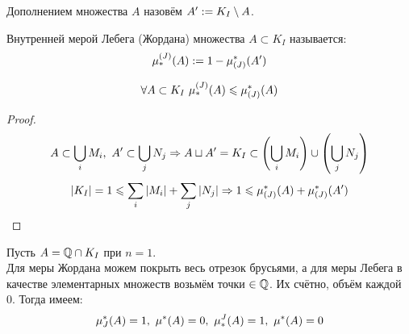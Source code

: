 \begin{definition}
	Дополнением множества $A$ назовём $A':=K_I\setminus A$.
\end{definition}
\begin{definition}
	Внутренней мерой Лебега (Жордана) множества $A\subset K_I$ называется:
	\[\mu_*^{(J)}(A):=1-\mu_{(J)}^*(A')\]
\end{definition}
\begin{theorem}\label{20_th2}
	\[\fa A\subset K_I\ \mu_*^{(J)}(A)\le\mu^*_{(J)}(A)\]
\end{theorem}
\begin{proof}
	\[A\subset\bc_iM_i,\ A'\subset\bc_jN_j\Ra A\sqcup A'=K_I\subset\l(\bc_iM_i\r)\cup\l(\bc_jN_j\r)\]
	\[|K_I|=1\le\sum_i|M_i|+\sum_j|N_j|\Ra1\le\ma(A)+\ma(A')\]
\end{proof}
\begin{example}
	Пусть $A=\mathbb{Q}\cap K_I$ при $n=1$. \\
	Для меры Жордана можем покрыть весь отрезок брусьями, а для меры Лебега в качестве элементарных множеств возьмём точки $\in\mathbb{Q}$. Их счётно, объём каждой 0. Тогда имеем:
	\[\mj(A)=1,\ \m(A)=0,\ \mu_*^J(A)=1,\ \mu^*(A)=0\]
\end{example}
